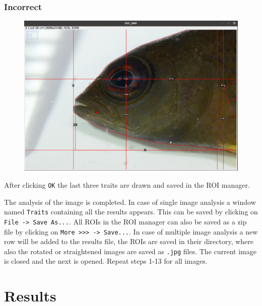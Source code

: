 \documentclass[
  letterpaper,
  DIV=11,
  numbers=noendperiod,
  oneside]{scrreprt}
\begin{document}
\hypertarget{incorrect}{%
\subsubsection{\texorpdfstring{\textbf{Incorrect}}{Incorrect}}\label{incorrect}}

\begin{figure}

{\centering \includegraphics{./images/screenshots/mouth_corner_wrong.png}

}

\end{figure}

After clicking \texttt{OK} the last three traits are drawn and saved in
the ROI manager.

The analysis of the image is completed. In case of single image analysis
a window named \texttt{Traits} containing all the results appears. This
can be saved by clicking on \texttt{File\ -\textgreater{}\ Save\ As...}.
All ROIs in the ROI manager can also be saved as a zip file by clicking
on
\texttt{More\ \textgreater{}\textgreater{}\textgreater{}\ -\textgreater{}\ Save...}.
In case of multiple image analysis a new row will be added to the
results file, the ROIs are saved in their directory, where also the
rotated or straightened images are saved as \texttt{.jpg} files. The
current image is closed and the next is opened. Repeat steps 1-13 for
all images.

\hypertarget{results}{%
\section{Results}\label{results}}
\end{document}
